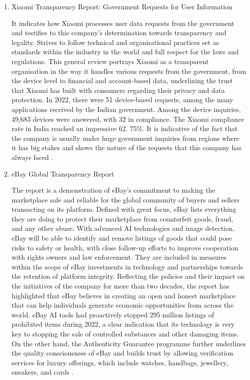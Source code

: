\begin{enumerate}
\item Xiaomi Transparency Report: Government Requests for User Information 

It indicates how Xiaomi processes user data requests from the government and testifies to this company's determination towards transparency and legality. Strives to follow technical and organisational practices set as standards within the industry in the world and full respect for the laws and regulations. This general review portrays Xiaomi as a transparent organisation in the way it handles various requests from the government, from the device level to financial and account-based data, underlining the trust that Xiaomi has built with consumers regarding their privacy and data protection. In 2022, there were 51 device-based requests, among the many applications received by the Indian government. Among the device inquiries, 49,683 devices were answered, with 32 in compliance. The Xiaomi compliance rate in India reached an impressive 62. 75\%. It is indicative of the fact that the company is usually under huge government inquiries from regions where it has big stakes and shows the nature of the requests that this company has always faced \cite{XiaomiTransparencyReport}.
 
\item eBay Global Transparency Report 

 The report is a demonstration of eBay's commitment to making the marketplace safe and reliable for the global community of buyers and sellers transacting on its platform. Defined with great focus, eBay lists everything they are doing to protect their marketplace from counterfeit goods, fraud, and any other abuse. With advanced AI technologies and image detection, eBay will be able to identify and remove listings of goods that could pose risks to safety or health, with close follow-up efforts to improve cooperation with rights owners and law enforcement. They are included in measures within the scope of eBay investments in technology and partnerships towards the retention of platform integrity. Reflecting the policies and their impact on the initiatives of the company for more than two decades, the report has highlighted that eBay believes in creating an open and honest marketplace that can help individuals generate economic opportunities from across the world. eBay AI tools had proactively stopped 295 million listings of prohibited items during 2022, a clear indication that its technology is very key to stopping the sale of controlled substances and other damaging items. On the other hand, the Authenticity Guarantee programme further underlines the quality consciousness of eBay and builds trust by allowing verification services for luxury offerings, which include watches, handbags, jewellery, sneakers, and cards \cite{eBayGlobalTransparencyReport2022}.


\end{enumerate}
